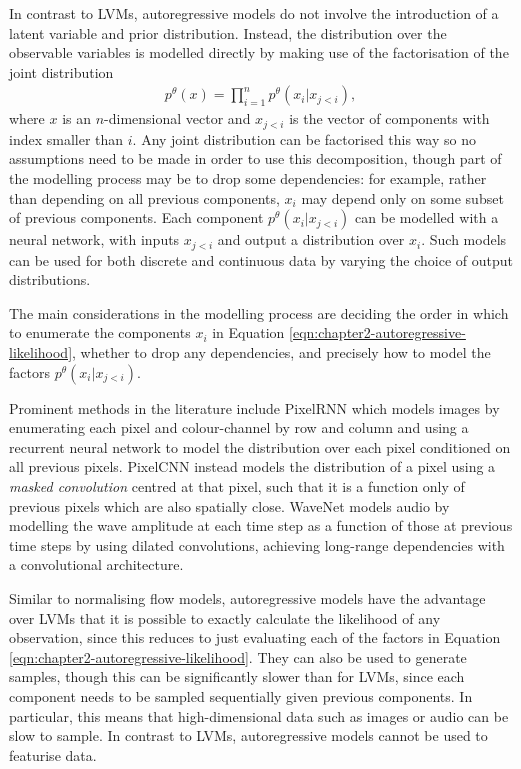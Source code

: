 In contrast to LVMs, autoregressive models do not involve the introduction of a latent variable and prior distribution.
Instead, the distribution over the observable variables is modelled directly by making use of the factorisation of the joint distribution
%
\begin{align}\label{eqn:chapter2-autoregressive-likelihood}
p^\theta(x) = \prod_{i=1}^{n} p^\theta(x_i | x_{j<i}),
\end{align}
%
where $x$ is an $n$-dimensional vector and $x_{j<i}$ is the vector of components with index smaller than $i$. 
Any joint distribution can be factorised this way so no assumptions need to be made in order to use this decomposition, though part of the modelling process may be to drop some dependencies: for example, rather than depending on all previous components, $x_i$ may depend only on some subset of previous components.
Each component $p^\theta(x_i | x_{j<i})$ can be modelled with a neural network, with inputs $x_{j<i}$ and output a distribution over $x_i$. 
Such models can be used for both discrete and continuous data by varying the choice of output distributions. 

The main considerations in the modelling process are deciding the order in which to enumerate the components $x_i$ in Equation \ref{eqn:chapter2-autoregressive-likelihood}, whether to drop any dependencies, and precisely how to model the factors $p^\theta(x_i | x_{j<i})$. 

Prominent methods in the literature include PixelRNN \citep{van2016pixel} which models images by enumerating each pixel and colour-channel by row and column and using a recurrent neural network to model the distribution over each pixel conditioned on all previous pixels. 
PixelCNN \citep{van2016conditional} instead models the distribution of a pixel using a \emph{masked convolution} centred at that pixel, such that it is a function only of previous pixels which are also spatially close.
WaveNet \citep{oord2016wavenet} models audio by modelling the wave amplitude at each time step as a function of those at previous time steps by using dilated convolutions, achieving long-range dependencies with a convolutional architecture.

Similar to normalising flow models, autoregressive models have the advantage over LVMs that it is possible to exactly calculate the likelihood of any observation, since this reduces to just evaluating each of the factors in Equation \ref{eqn:chapter2-autoregressive-likelihood}.
They can also be used to generate samples, though this can be significantly slower than for LVMs, since each component needs to be sampled sequentially given previous components. 
In particular, this means that high-dimensional data such as images or audio can be slow to sample. 
In contrast to LVMs, autoregressive models cannot be used to featurise data.



